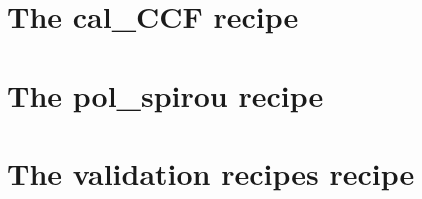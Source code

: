 \clearpage
\newpage
\section{The cal\_CCF recipe}
\label{ch:the_recipes:cal_CCF_E2DS_spirou}


\clearpage
\newpage
\section{The pol\_spirou recipe}
\label{ch:the_recipes:pol_spirou}


\clearpage
\newpage
\section{The validation recipes recipe}
\label{ch:the_recipes:cal_validate_spirou}

